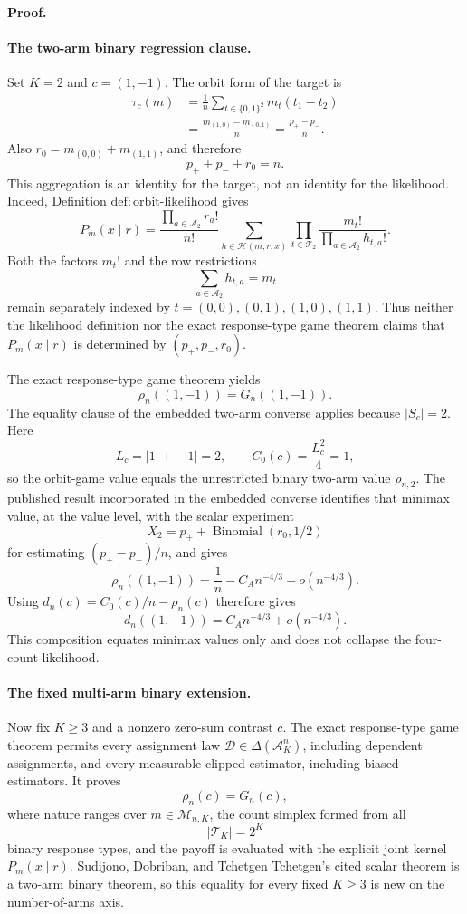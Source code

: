 \textbf{Proof.}

\paragraph{The two-arm binary regression clause.}
Set \(K=2\) and \(c=(1,-1)\).  The orbit form of the target is
\[
 \begin{aligned}
 \tau_c(m)
 &=\frac{1}{n}\sum_{t\in\{0,1\}^2}m_t(t_1-t_2)\\
 &=\frac{m_{(1,0)}-m_{(0,1)}}{n}
 =\frac{p_+-p_-}{n}.
 \end{aligned}
\]
Also \(r_0=m_{(0,0)}+m_{(1,1)}\), and therefore
\[
 p_++p_-+r_0=n.
\]
This aggregation is an identity for the target, not an identity for the likelihood.  Indeed, Definition \(\mathrm{def{:}orbit\text{-}likelihood}\) gives
\[
 P_m(x\mid r)
 =\frac{\prod_{a\in\mathcal A_2}r_a!}{n!}
 \sum_{h\in\mathcal H(m,r,x)}
 \prod_{t\in\mathcal T_2}
 \frac{m_t!}{\prod_{a\in\mathcal A_2}h_{t,a}!}.
\]
Both the factors \(m_t!\) and the row restrictions
\[
 \sum_{a\in\mathcal A_2}h_{t,a}=m_t
\]
remain separately indexed by \(t=(0,0),(0,1),(1,0),(1,1)\).  Thus neither the likelihood definition nor the exact response-type game theorem claims that \(P_m(x\mid r)\) is determined by \((p_+,p_-,r_0)\).

The exact response-type game theorem yields
\[
 \rho_n((1,-1))=G_n((1,-1)).
\]
The equality clause of the embedded two-arm converse applies because \(|S_c|=2\).  Here
\[
 L_c=|1|+|-1|=2,
 \qquad
 C_0(c)=\frac{L_c^2}{4}=1,
\]
so the orbit-game value equals the unrestricted binary two-arm value \(\rho_{n,2}\).  The published result incorporated in the embedded converse identifies that minimax value, at the value level, with the scalar experiment
\[
 X_2=p_++\operatorname{Binomial}(r_0,1/2)
\]
for estimating \((p_+-p_-)/n\), and gives
\[
 \rho_n((1,-1))
 =\frac1n-C_A n^{-4/3}+o(n^{-4/3}).
\]
Using \(d_n(c)=C_0(c)/n-\rho_n(c)\) therefore gives
\[
 d_n((1,-1))=C_A n^{-4/3}+o(n^{-4/3}).
\]
This composition equates minimax values only and does not collapse the four-count likelihood.

\paragraph{The fixed multi-arm binary extension.}
Now fix \(K\geq3\) and a nonzero zero-sum contrast \(c\).  The exact response-type game theorem permits every assignment law \(\mathcal D\in\Delta(\mathcal A_K^n)\), including dependent assignments, and every measurable clipped estimator, including biased estimators.  It proves
\[
 \rho_n(c)=G_n(c),
\]
where nature ranges over \(m\in\mathcal M_{n,K}\), the count simplex formed from all
\[
 |\mathcal T_K|=2^K
\]
binary response types, and the payoff is evaluated with the explicit joint kernel \(P_m(x\mid r)\).  Sudijono, Dobriban, and Tchetgen Tchetgen's cited scalar theorem is a two-arm binary theorem, so this equality for every fixed \(K\geq3\) is new on the number-of-arms axis.

